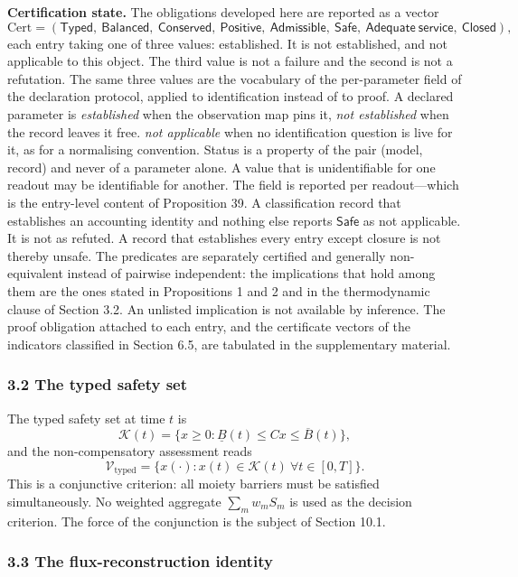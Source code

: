 \documentclass[11pt]{article}
\begin{document}
\textbf{Certification state.} The obligations developed here are reported as a vector \[ \mathrm{Cert}=(\mathsf{Typed},\ \mathsf{Balanced},\ \mathsf{Conserved},\ \mathsf{Positive},\ \mathsf{Admissible},\ \mathsf{Safe},\ \mathsf{Adequate\ service},\ \mathsf{Closed}), \] each entry taking one of three values: established. It is not established, and not applicable to this object. The third value is not a failure and the second is not a refutation. The same three values are the vocabulary of the per-parameter field of the declaration protocol, applied to identification instead of to proof. A declared parameter is \emph{established} when the observation map pins it, \emph{not established} when the record leaves it free. \emph{not applicable} when no identification question is live for it, as for a normalising convention. Status is a property of the pair (model, record) and never of a parameter alone. A value that is unidentifiable for one readout may be identifiable for another. The field is reported per readout---which is the entry-level content of Proposition 39. A classification record that establishes an accounting identity and nothing else reports \(\mathsf{Safe}\) as not applicable. It is not as refuted. A record that establishes every entry except closure is not thereby unsafe. The predicates are separately certified and generally non-equivalent instead of pairwise independent: the implications that hold among them are the ones stated in Propositions 1 and 2 and in the thermodynamic clause of Section 3.2. An unlisted implication is not available by inference. The proof obligation attached to each entry, and the certificate vectors of the indicators classified in Section 6.5, are tabulated in the supplementary material.


\subsubsection{3.2 The typed safety set}\label{the-typed-safety-set}

The typed safety set at time \(t\) is \[\mathcal{K}(t) = \{ x \ge 0 : \underline{B}(t) \le Cx \le \overline{B}(t) \},\] and the non-compensatory assessment reads \[\mathcal{V}_{\mathrm{typed}} = \{ x(\cdot) : x(t) \in \mathcal{K}(t)\ \forall t \in [0,T] \}.\] This is a conjunctive criterion: all moiety barriers must be satisfied simultaneously. No weighted aggregate \(\sum_m w_m S_m\) is used as the decision criterion. The force of the conjunction is the subject of Section 10.1.

\subsubsection{3.3 The flux-reconstruction
identity}\label{the-flux-reconstruction-identity}
\end{document}
